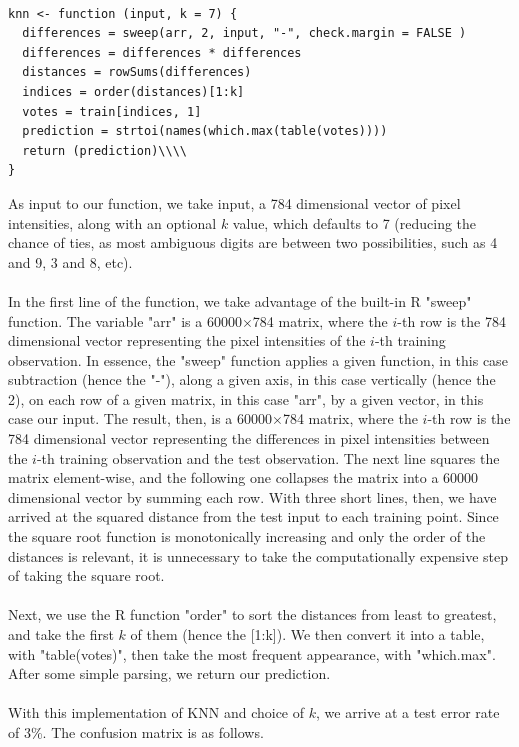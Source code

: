 \documentclass[10pt]{extarticle}
\begin{document}
\begin{verbatim}

knn <- function (input, k = 7) {
  differences = sweep(arr, 2, input, "-", check.margin = FALSE )
  differences = differences * differences
  distances = rowSums(differences)
  indices = order(distances)[1:k]
  votes = train[indices, 1]
  prediction = strtoi(names(which.max(table(votes))))
  return (prediction)\\\\
}
\end{verbatim}
As input to our function, we take input, a 784 dimensional vector of pixel intensities, along with an optional $k$ value, which defaults to 7 (reducing the chance of ties, as most ambiguous digits are between two possibilities, such as 4 and 9, 3 and 8, etc). \\\\
In the first line of the function, we take advantage of the built-in R "sweep" function. The variable "arr" is a 60000$\times$784 matrix, where the $i$-th row is the 784 dimensional vector representing the pixel intensities of the $i$-th training observation. In essence, the "sweep" function applies a given function, in this case subtraction (hence the "-"), along a given axis, in this case vertically (hence the 2), on each row of a given matrix, in this case "arr", by a given vector, in this case our input. The result, then, is a 60000$\times$784 matrix, where the $i$-th row is the 784 dimensional vector representing the differences in pixel intensities between the $i$-th training observation and the test observation. The next line squares the matrix element-wise, and the following one collapses the matrix into a 60000 dimensional vector by summing each row. With three short lines, then, we have arrived at the squared distance from the test input to each training point. Since the square root function is monotonically increasing and only the order of the distances is relevant, it is unnecessary to take the computationally expensive step of taking the square root. \\\\
Next, we use the R function "order" to sort the distances from least to greatest, and take the first $k$ of them (hence the [1:k]). We then convert it into a table, with "table(votes)", then take the most frequent appearance, with "which.max". After some simple parsing, we return our prediction. \\\\
With this implementation of KNN and choice of $k$, we arrive at a test error rate of 3\%. The confusion matrix is as follows.
\end{document}
